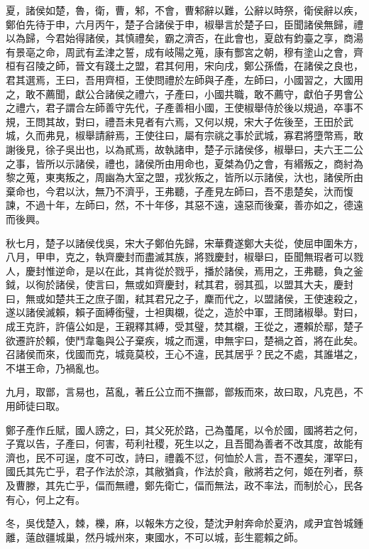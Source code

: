 \begin{pinyinscope}
夏，諸侯如楚，魯，衛，曹，邾，不會，曹邾辭以難，公辭以時祭，衛侯辭以疾，鄭伯先待于申，六月丙午，楚子合諸侯于申，椒舉言於楚子曰，臣聞諸侯無歸，禮以為歸，今君始得諸侯，其慎禮矣，霸之濟否，在此會也，夏啟有鈞臺之享，商湯有景亳之命，周武有孟津之誓，成有岐陽之蒐，康有酆宮之朝，穆有塗山之會，齊桓有召陵之師，晉文有踐土之盟，君其何用，宋向戌，鄭公孫僑，在諸侯之良也，君其選焉，王曰，吾用齊桓，王使問禮於左師與子產，左師曰，小國習之，大國用之，敢不薦聞，獻公合諸侯之禮六，子產曰，小國共職，敢不薦守，獻伯子男會公之禮六，君子謂合左師善守先代，子產善相小國，王使椒舉侍於後以規過，卒事不規，王問其故，對曰，禮吾未見者有六焉，又何以規，宋大子佐後至，王田於武城，久而弗見，椒舉請辭焉，王使往曰，屬有宗祧之事於武城，寡君將墮幣焉，敢謝後見，徐子吳出也，以為貳焉，故執諸申，楚子示諸侯侈，椒舉曰，夫六王二公之事，皆所以示諸侯，禮也，諸侯所由用命也，夏桀為仍之會，有緡叛之，商紂為黎之蒐，東夷叛之，周幽為大室之盟，戎狄叛之，皆所以示諸侯，汏也，諸侯所由棄命也，今君以汏，無乃不濟乎，王弗聽，子產見左師曰，吾不患楚矣，汏而愎諫，不過十年，左師曰，然，不十年侈，其惡不遠，遠惡而後棄，善亦如之，德遠而後興。

秋七月，楚子以諸侯伐吳，宋大子鄭伯先歸，宋華費遂鄭大夫從，使屈申圍朱方，八月，甲申，克之，執齊慶封而盡滅其族，將戮慶封，椒舉曰，臣聞無瑕者可以戮人，慶封惟逆命，是以在此，其肯從於戮乎，播於諸侯，焉用之，王弗聽，負之釜鉞，以徇於諸侯，使言曰，無或如齊慶封，弒其君，弱其孤，以盟其大夫，慶封曰，無或如楚共王之庶子圍，弒其君兄之子，麇而代之，以盟諸侯，王使速殺之，遂以諸侯滅賴，賴子面縛銜璧，士袒輿櫬，從之，造於中軍，王問諸椒舉。對曰，成王克許，許僖公如是，王親釋其縛，受其璧，焚其櫬，王從之，遷賴於鄢，楚子欲遷許於賴，使鬥韋龜與公子棄疾，城之而還，申無宇曰，楚禍之首，將在此矣。召諸侯而來，伐國而克，城竟莫校，王心不違，民其居乎？民之不處，其誰堪之，不堪王命，乃禍亂也。

九月，取鄫，言易也，莒亂，著丘公立而不撫鄫，鄫叛而來，故曰取，凡克邑，不用師徒曰取。

鄭子產作丘賦，國人謗之，曰，其父死於路，己為蠆尾，以令於國，國將若之何，子寬以告，子產曰，何害，苟利社稷，死生以之，且吾聞為善者不改其度，故能有濟也，民不可逞，度不可改，詩曰，禮義不愆，何恤於人言，吾不遷矣，渾罕曰，國氏其先亡乎，君子作法於涼，其敝猶貪，作法於貪，敝將若之何，姬在列者，蔡及曹滕，其先亡乎，偪而無禮，鄭先衛亡，偪而無法，政不率法，而制於心，民各有心，何上之有。

冬，吳伐楚入，棘，櫟，麻，以報朱方之役，楚沈尹射奔命於夏汭，咸尹宜咎城鍾離，薳啟疆城巢，然丹城州來，東國水，不可以城，彭生罷賴之師。


\end{pinyinscope}
